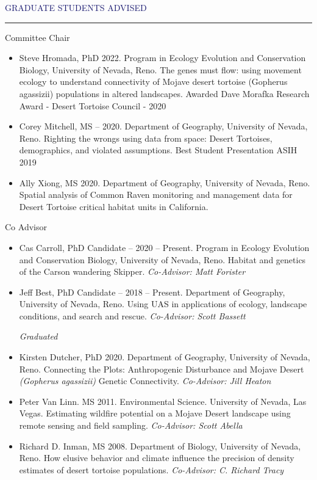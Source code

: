 \documentclass{resume} %
\renewenvironment{rSection}[1]{
\sectionskip
\textcolor{MidnightBlue}{\MakeUppercase{#1}}
\sectionlineskip
\hrule
\begin{list}{}{
\setlength{\leftmargin}{1.5em}
}
\item[]
}{
\end{list}
}
\begin{document}
\begin{rSection}{Graduate Students Advised}
\begin{rSubsection}{Committee Chair}{}{}{}
\begin{itemize}
\item[] Steve Hromada, PhD 2022. Program in Ecology Evolution and Conservation Biology, University of Nevada, Reno. The genes must flow: using movement ecology to understand connectivity of Mojave desert tortoise (Gopherus agassizii) populations in altered landscapes. Awarded Dave Morafka Research Award - Desert Tortoise Council - 2020

\item[] Corey Mitchell, MS – 2020. Department of Geography, University of Nevada, Reno. Righting the wrongs using data from space: Desert Tortoises, demographics, and violated assumptions. Best Student Presentation ASIH 2019

\item[] Ally Xiong, MS 2020. Department of Geography, University of Nevada, Reno. Spatial analysis of Common Raven monitoring and management data for Desert Tortoise critical habitat units in California.
\end{itemize}
\end{rSubsection}

\begin{rSubsection}{Co Advisor}{}{}{}
\begin{itemize}
\item[] Cas Carroll, PhD Candidate – 2020 – Present. Program in Ecology Evolution and Conservation Biology, University of Nevada, Reno.  Habitat and genetics of the Carson wandering Skipper. \textit{Co-Advisor: Matt Forister}

\item[] Jeff Best, PhD Candidate – 2018 – Present. Department of Geography, University of Nevada, Reno.  Using UAS in applications of ecology, landscape conditions, and search and rescue. \textit{Co-Advisor: Scott Bassett}


\textit{Graduated}

\item[] Kirsten Dutcher, PhD 2020. Department of Geography, University of Nevada, Reno. Connecting the Plots: Anthropogenic Disturbance and Mojave Desert \textit{(Gopherus agassizii)} Genetic Connectivity. \textit{Co-Advisor: Jill Heaton}

\item[] Peter Van Linn. MS 2011. Environmental Science. University of Nevada, Las Vegas. Estimating wildfire potential on a Mojave Desert landscape using remote sensing and field sampling. \textit{Co-Advisor: Scott Abella}

\item[] Richard D. Inman, MS 2008. Department of Biology, University of Nevada, Reno. How elusive behavior and climate influence the precision of density estimates of desert tortoise populations. \textit{Co-Advisor: C. Richard Tracy}


\end{itemize}
\end{rSubsection}
\end{rSection}
\end{document}

